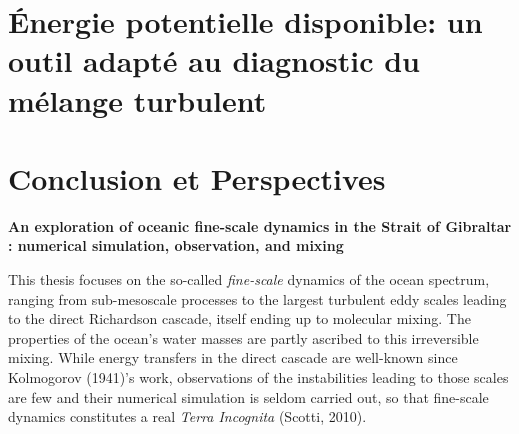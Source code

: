 \documentclass[a4paper,12pt,notitlepage,twoside]{report}
\numberwithin{equation}{section}
\begin{document}
\chapter{Énergie potentielle disponible: un outil adapté au diagnostic du mélange turbulent}
\label{chapBPE}




\chapter{Conclusion et Perspectives}


\newpage
 \null

\listoffigures {}


\listoftables {}





\newpage
\thispagestyle{empty}
\begin{center}
\textbf{An exploration of oceanic fine-scale dynamics in the Strait of Gibraltar : numerical simulation, observation, and mixing}
\end{center} 
This thesis focuses on the so-called \textit{fine-scale} dynamics of the ocean spectrum, ranging from sub-mesoscale processes to the largest turbulent eddy scales leading to the direct Richardson cascade, itself ending up to molecular mixing. The properties of the ocean's water masses are partly ascribed to this irreversible mixing. While energy transfers in the direct cascade are well-known since Kolmogorov (1941)'s work, observations of the instabilities leading to those scales are few and their numerical simulation is seldom carried out, so that fine-scale dynamics constitutes a real \textit{Terra Incognita} (Scotti, 2010).
\end{document}
